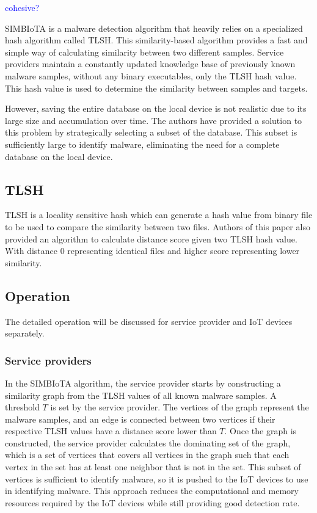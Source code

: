 \documentclass[
	a4paper, %
	10pt, %
	unnumberedsections, %
	twoside, %
]{LTJournalArticle}
\begin{document}
\textcolor{blue}{cohesive?}

SIMBIoTA is a malware detection algorithm that heavily relies on a specialized hash algorithm called TLSH. This similarity-based algorithm provides a fast and simple way of calculating similarity between two different samples. Service providers maintain a constantly updated knowledge base of previously known malware samples, without any binary executables, only the TLSH hash value. This hash value is used to determine the similarity between samples and targets.

However, saving the entire database on the local device is not realistic due to its large size and accumulation over time. The authors have provided a solution to this problem by strategically selecting a subset of the database. This subset is sufficiently large to identify malware, eliminating the need for a complete database on the local device.

\subsection{TLSH}
TLSH is a locality sensitive hash\autocite{6754635} which can generate a hash value from binary file to be used to compare the similarity between two files. Authors of this paper also provided an algorithm to calculate distance score given two TLSH hash value. With distance 0 representing identical files and higher score representing lower similarity.

\subsection{Operation}
The detailed operation will be discussed for service provider and IoT devices separately.

\subsubsection{Service providers}
In the SIMBIoTA algorithm, the service provider starts by constructing a similarity graph from the TLSH values of all known malware samples. A threshold $T$ is set by the service provider. The vertices of the graph represent the malware samples, and an edge is connected between two vertices if their respective TLSH values have a distance score lower than $T$. Once the graph is constructed, the service provider calculates the dominating set of the graph, which is a set of vertices that covers all vertices in the graph such that each vertex in the set has at least one neighbor that is not in the set. This subset of vertices is sufficient to identify malware, so it is pushed to the IoT devices to use in identifying malware. This approach reduces the computational and memory resources required by the IoT devices while still providing good detection rate.
\end{document}
